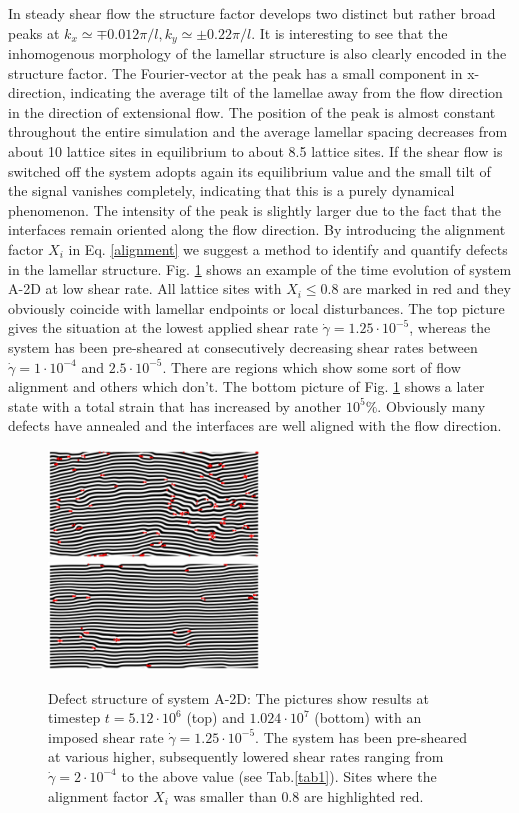 \documentclass[8.5pt,twoside,twocolumn]{article}
\newcommand{\e}[1]{\cdot10^{#1}}
\newcommand{\gd}{\dot{\gamma}}
\begin{document}
In steady shear flow the structure factor develops two distinct but rather broad peaks at $k_x\simeq\mp 0.012\pi/l, k_y\simeq\pm 0.22 \pi/l$.
It is interesting to see that the inhomogenous morphology of the lamellar structure is also clearly encoded in the structure factor. 
The Fourier-vector at the peak has a small component in x-direction, indicating the average tilt of the lamellae away from the flow direction in the direction of extensional flow.
The position of the peak is almost constant throughout the entire simulation and the average lamellar spacing decreases from about 10 lattice sites in equilibrium to about 8.5 lattice sites.
If the shear flow is switched off the system adopts again its equilibrium value and the small tilt of the signal vanishes completely, indicating that this is a purely dynamical phenomenon. 
The intensity of the peak is slightly larger due to the fact that the interfaces remain oriented along the flow direction.
By introducing the alignment factor $X_i$ in Eq. \ref{alignment} we suggest a method to identify and quantify defects in the lamellar structure.
Fig. \ref{fig5} shows an example of the time evolution of system A-2D at low shear rate.
All lattice sites with $X_i\le0.8$ are marked in red and they obviously coincide with lamellar endpoints or local disturbances.
The top picture gives the situation at the lowest applied shear rate $\dot{\gamma}=1.25\e{-5}$, whereas the system has been pre-sheared at consecutively decreasing shear rates between $\gd=1\e{-4}$ and $2.5\e{-5}$.
There are regions which show some sort of flow alignment and others which don't.
The bottom picture of Fig. \ref{fig5} shows a later state with a total strain that has increased by another $10^{5}\%$. 
Obviously many defects have annealed and the interfaces are well aligned with the flow direction.

\begin{figure}[htp!]
\centering
\includegraphics[angle=0,width=0.5\textwidth]{phi_defects_run774_5120.jpg}
\includegraphics[angle=0,width=0.5\textwidth]{phi_defects_run774_10240.jpg}
\caption{Defect structure of system A-2D: The pictures show results at timestep $t=5.12\e{6}$ (top) and $1.024\e{7}$ (bottom) with an imposed shear rate $\dot{\gamma}=1.25\cdot10^{-5}$. The system has been pre-sheared at various higher, subsequently lowered shear rates ranging from $\dot{\gamma}=2\e{-4}$ to the above value (see Tab.\ref{tab1}). Sites where the alignment factor $X_i$ was smaller than $0.8$ are highlighted red.}
\label{fig5}
\end{figure}
\end{document}
